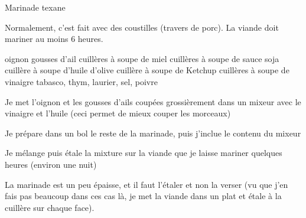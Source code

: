 \begin{recette}{Marinade texane}
\begin{remarque}
Normalement, c'est fait avec des coustilles (travers de porc). La viande doit mariner au moins 6 heures.
\end{remarque}
\begin{ingredients}
 oignon
 gousses d'ail
 cuillères à soupe de miel
 cuillères à soupe de sauce soja
 cuillère à soupe d'huile d'olive
 cuillère à soupe de Ketchup
 cuillères à soupe de vinaigre
\ingredient tabasco, thym, laurier, sel, poivre
\end{ingredients}

\begin{preparation}
\item Je met l'oignon et les gousses d'ails coupées grossièrement dans un mixeur avec le vinaigre et l'huile (ceci permet de mieux couper les morceaux)
\item Je prépare dans un bol le reste de la marinade, puis j'inclue le contenu du mixeur
\item Je mélange puis étale la mixture sur la viande que je laisse mariner quelques heures (environ une nuit)
\end{preparation}

\begin{remarque}
La marinade est un peu épaisse, et il faut l'étaler et non la verser (vu que j'en fais pas beaucoup dans ces cas là, je met la viande dans un plat et étale à la cuillère sur chaque face).
\end{remarque}
\end{recette}
